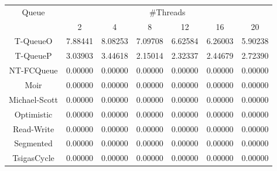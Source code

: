 \begin{tabular}{|c|c|c|c|c|c|c|}
\hline
\multirow{2}{*}{Queue} & \multicolumn{6}{c|}{\#Threads}\\\cline{2-7}& 2 & 4 & 8 & 12 & 16 & 20\\
\hline
\hline
T-QueueO & 7.88441 & 8.08253 & 7.09708 & 6.62584 & 6.26003 & 5.90238\\
T-QueueP & 3.03903 & 3.44618 & 2.15014 & 2.32337 & 2.44679 & 2.72390\\
NT-FCQueue & 0.00000 & 0.00000 & 0.00000 & 0.00000 & 0.00000 & 0.00000\\
Moir & 0.00000 & 0.00000 & 0.00000 & 0.00000 & 0.00000 & 0.00000\\
Michael-Scott & 0.00000 & 0.00000 & 0.00000 & 0.00000 & 0.00000 & 0.00000\\
Optimistic & 0.00000 & 0.00000 & 0.00000 & 0.00000 & 0.00000 & 0.00000\\
Read-Write & 0.00000 & 0.00000 & 0.00000 & 0.00000 & 0.00000 & 0.00000\\
Segmented & 0.00000 & 0.00000 & 0.00000 & 0.00000 & 0.00000 & 0.00000\\
TsigasCycle & 0.00000 & 0.00000 & 0.00000 & 0.00000 & 0.00000 & 0.00000\\
\hline\end{tabular}
